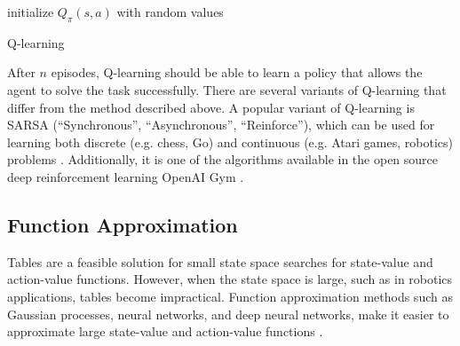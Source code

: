 {\centering
\begin{minipage}{.8\linewidth}
    \begin{algorithm}[H]
      initialize $Q_\pi(s,a)$  with random values\;
      
      \caption{Q-learning}\label{alg:q-learning}
    \end{algorithm}
\end{minipage}
\par
}


After $n$ episodes, Q-learning should be able to learn a policy that allows the agent to solve the task successfully. There are several variants of Q-learning that differ from the method described above. A popular variant of Q-learning is SARSA (“Synchronous”, “Asynchronous”, “Reinforce”), which can be used for learning both discrete (e.g. chess, Go) and continuous (e.g. Atari games, robotics) problems \cite{sutton2018reinforcement}. Additionally, it is one of the algorithms available in the open source deep reinforcement learning OpenAI Gym \cite{openaigym}.



\subsection{Function Approximation}\label{chap2:function-approx}
Tables are a feasible solution for small state space searches for state-value and action-value functions. However, when the state space is large, such as in robotics applications, tables become impractical. 
Function approximation methods such as Gaussian processes, neural networks, and deep neural networks, make it easier to approximate large state-value and action-value functions \cite{sutton2018reinforcement}.

